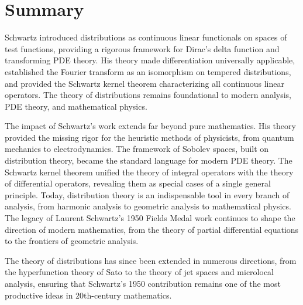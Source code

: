 \section*{Summary}

Schwartz introduced distributions as continuous linear functionals on spaces of test functions, providing a rigorous framework for Dirac's delta function and transforming PDE theory. His theory made differentiation universally applicable, established the Fourier transform as an isomorphism on tempered distributions, and provided the Schwartz kernel theorem characterizing all continuous linear operators. The theory of distributions remains foundational to modern analysis, PDE theory, and mathematical physics.

The impact of Schwartz's work extends far beyond pure mathematics. His theory provided the missing rigor for the heuristic methods of physicists, from quantum mechanics to electrodynamics. The framework of Sobolev spaces, built on distribution theory, became the standard language for modern PDE theory. The Schwartz kernel theorem unified the theory of integral operators with the theory of differential operators, revealing them as special cases of a single general principle. Today, distribution theory is an indispensable tool in every branch of analysis, from harmonic analysis to geometric analysis to mathematical physics. The legacy of Laurent Schwartz's 1950 Fields Medal work continues to shape the direction of modern mathematics, from the theory of partial differential equations to the frontiers of geometric analysis.

The theory of distributions has since been extended in numerous directions, from the hyperfunction theory of Sato to the theory of jet spaces and microlocal analysis, ensuring that Schwartz's 1950 contribution remains one of the most productive ideas in 20th-century mathematics.
